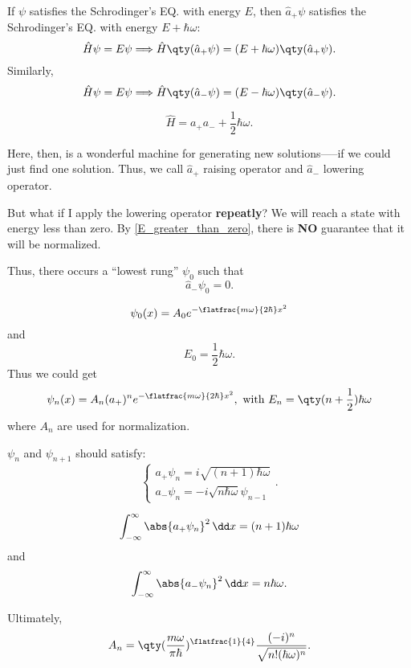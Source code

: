 \begin{thm}
	If $\psi$ satisfies the Schrodinger's EQ. with energy $E$, then $\hat{a}_+\psi$ satisfies the Schrodinger's EQ. with energy $E+\hbar\omega$:
	\[
		\hat{H}\psi=E\psi\Longrightarrow\hat{H}\qty(\hat{a}_+\psi)=(E+\hbar\omega)\qty(\hat{a}_+\psi)
		.\]
	Similarly,
	\[
		\hat{H}\psi=E\psi\Longrightarrow\hat{H}\qty(\hat{a}_-\psi)=(E-\hbar\omega)\qty(\hat{a}_-\psi)
		.\]
\end{thm}
\begin{prf}
	\[
		\hat{H}=a_+a_-+\frac{1}{2}\hbar\omega
		.\]
\end{prf}

Here, then, is a wonderful machine for generating new solutions-----if we could just find one solution. Thus, we call $\hat{a}_+$ raising operator and $\hat{a}_-$ lowering operator.

But what if I apply the lowering operator \textbf{repeatly}? We will reach a state with energy less than zero. By \ref{E_greater_than_zero}, there is \textbf{NO} guarantee that it will be normalized.

\begin{prp}
	Thus, there occurs a ``lowest rung'' $\psi_0$ such that
	\[
		\hat{a}_-\psi_0=0
		.\]
\end{prp}

\begin{thm}
	\[
		\psi_0(x)=A_0e^{-\flatfrac{m\omega}{2\hbar}x^2}
	\] and
	\[
		E_0=\frac{1}{2}\hbar\omega
		.\]
	Thus we could get
	\[
		\psi_n(x)=A_n(a_+)^ne^{-\flatfrac{m\omega}{2\hbar}x^2},\mbox{ with }E_n=\qty(n+\frac{1}{2})\hbar\omega
	\]
	where $A_n$ are used for normalization.
\end{thm}

\begin{thm}$\psi_n$ and $\psi_{n+1}$ should satisfy:
	\[
		\begin{cases}
			a_+\psi_n=i\sqrt{(n+1)\hbar\omega} \\[9pt]
			a_-\psi_n=-i\sqrt{n\hbar\omega}\psi_{n-1}
		\end{cases}
		.\]
\end{thm}
\begin{prf}
	\[
		\int_{-\infty}^{\infty} \abs{a_+\psi_n}^2 \,\dd x=(n+1)\hbar\omega
	\]
	and
	\[
		\int_{-\infty}^{\infty} \abs{a_-\psi_n}^2 \,\dd x=n\hbar\omega
		.\]
\end{prf}

Ultimately,
\[
	A_n=\qty(\frac{m\omega}{\pi\hbar})^{\flatfrac{1}{4}} \frac{(-i)^n}{\sqrt{n!(\hbar\omega)^n}}
	.\]

